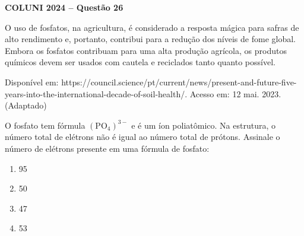 \textbf{COLUNI 2024 -- Questão 26}\par\medskip O uso de fosfatos, na agricultura, é considerado a resposta mágica para safras de alto rendimento e, portanto, contribui para a redução dos níveis de fome global. Embora os fosfatos contribuam para uma alta produção agrícola, os produtos químicos devem ser usados com cautela e reciclados tanto quanto possível.

Disponível em: https://council.science/pt/current/news/present-and-future-five-years-into-the-international-decade-of-soil-health/. Acesso em: 12 mai. 2023. (Adaptado)

O fosfato tem fórmula $(\mathrm{PO}_4)^{3-}$ e é um íon poliatômico. Na estrutura, o número total de elétrons não é igual ao número total de prótons. Assinale o número de elétrons presente em uma fórmula de fosfato:
\begin{enumerate}
\item 95
\item 50
\item 47
\item 53
\end{enumerate}
